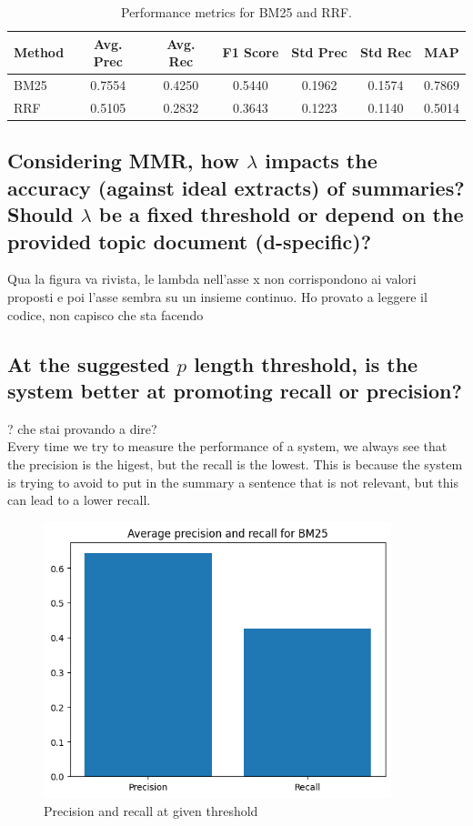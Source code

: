\begin{center}
    \begin{table}[H]
        \centering
        \begin{tabular}{|l|c|c|c|c|c|c|}
            \hline
            Method & Avg. Prec & Avg. Rec & F1 Score & Std Prec & Std Rec & MAP    \\
            \hline
            BM25   & 0.7554    & 0.4250   & 0.5440   & 0.1962   & 0.1574  & 0.7869 \\
            \hline
            RRF    & 0.5105    & 0.2832   & 0.3643   & 0.1223   & 0.1140  & 0.5014 \\
            \hline
        \end{tabular}
        \caption{Performance metrics for BM25 and RRF.}
        \label{tab:bm25_rrf}
    \end{table}
\end{center}

\subsection{Considering MMR, how $\lambda$ impacts the accuracy (against ideal extracts) of summaries? Should $\lambda$ be a fixed threshold or depend on the provided topic document (d-specific)?}
Qua la figura va rivista, le lambda nell'asse x non corrispondono ai valori
proposti e poi l'asse sembra su un insieme continuo. Ho provato a leggere il
codice, non capisco che sta facendo
\subsection{At the suggested $p$ length threshold, is the system better at promoting recall or precision?}

? che stai provando a dire? \\Every time we try to measure the performance of a system, we always see that the precision is the higest, but the recall is the lowest. This is because the system is trying to avoid to put in the summary a sentence that is not relevant, but this can lead to a lower recall.

\begin{figure}
    \centering
    \includegraphics[width=0.9\textwidth]{images/pre_rec.png}
    \caption{Precision and recall at given threshold}
    \label{fig:Precision and recall}
\end{figure}